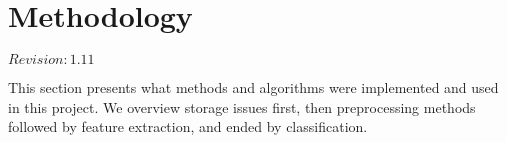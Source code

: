 \chapter{Methodology}

$Revision: 1.11 $

This section presents what methods and algorithms were implemented and used
in this project. We overview storage issues first, then preprocessing
methods followed by feature extraction, and ended by classification.


\clearpage


\clearpage


\clearpage

%


\clearpage

